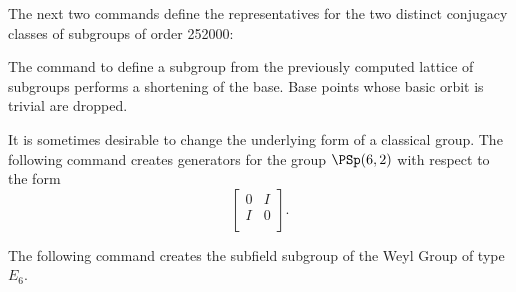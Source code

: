 
\bigskip

The next two commands define the representatives 
for the two distinct conjugacy classes of subgroups of order 252000:




The command to define a subgroup from 
the previously computed lattice of subgroups performs 
a shortening of the base. 
Base points whose basic orbit is trivial are dropped.


\bigskip



It is sometimes desirable to change the underlying form of a classical group. 
The following command creates generators for the group $\PSp(6,2)$ with respect to the form 
$$
\left[
\begin{array}{cc}
0 & I\\
I & 0\\
\end{array}
\right].
$$




\bigskip



The following command creates the subfield subgroup of the Weyl Group of type $E_6$.




\bigskip



